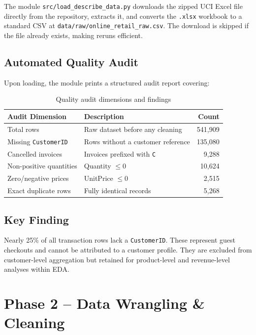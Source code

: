 \documentclass[12pt,a4paper]{report}
\begin{document}
The module \texttt{src/load\_describe\_data.py} downloads the zipped UCI Excel file directly from the repository, extracts it, and converts the \texttt{.xlsx} workbook to a standard CSV at \texttt{data/raw/online\_retail\_raw.csv}. The download is skipped if the file already exists, making reruns efficient.

\section{Automated Quality Audit}

Upon loading, the module prints a structured audit report covering:

\begin{table}[H]
\centering
\caption{Quality audit dimensions and findings}
\begin{tabularx}{\textwidth}{lXr}
\toprule
\textbf{Audit Dimension} & \textbf{Description} & \textbf{Count} \\
\midrule
Total rows & Raw dataset before any cleaning & 541,909 \\
Missing \texttt{CustomerID} & Rows without a customer reference & 135,080 \\
Cancelled invoices & Invoices prefixed with \texttt{C} & 9,288 \\
Non-positive quantities & Quantity $\le 0$ & 10,624 \\
Zero/negative prices & UnitPrice $\le 0$ & 2,515 \\
Exact duplicate rows & Fully identical records & 5,268 \\
\bottomrule
\end{tabularx}
\end{table}

\section{Key Finding}

Nearly 25\% of all transaction rows lack a \texttt{CustomerID}. These represent guest checkouts and cannot be attributed to a customer profile. They are excluded from customer-level aggregation but retained for product-level and revenue-level analyses within EDA.

\chapter{Phase 2 -- Data Wrangling \& Cleaning}
\end{document}
